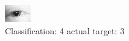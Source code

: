 \begin{figure}[h!]
\begin{center}
\includegraphics[width=0.60\columnwidth]{figures/ID58_class_4_target_3.png}
\end{center}
\caption{ Classification: 4 actual target: 3}
\label{fig:ID58_class_4_target_3}
\end{figure}
